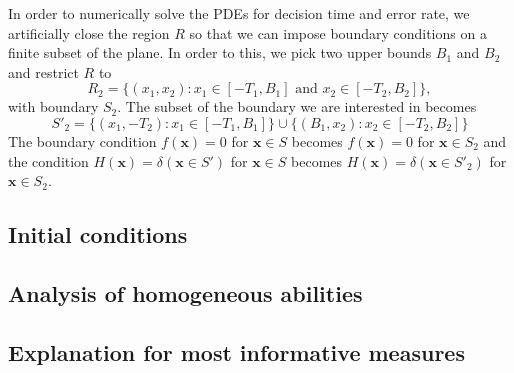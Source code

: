 \documentclass{article}
\newcommand{\mb}{\mathbf}
\begin{document}
In order to  numerically solve the PDEs for decision time and error rate, we artificially close the region $R$ so that we can impose boundary conditions on a finite subset of the plane. In order to this, we pick two upper bounds $B_1$ and $B_2$ and restrict $R$ to $$R_2=\{(x_1,x_2): x_1\in [-T_1,B_1] \text{ and } x_2\in[ -T_2,B_2]\},$$ with boundary $S_2$. The subset of the boundary we are interested in becomes 
$$S'_2=\{(x_1,-T_2):x_1\in [-T_1,B_1]\}\cup\{(B_1,x_2):x_2\in [-T_2,B_2]\}$$
The boundary condition $f({\mb x})=0$ for ${\mb x}\in S$ becomes $f({\mb x})=0$ for ${\mb x}\in S_2$ and the condition $H({\mb x})=\delta({\mb x}\in S')$ for ${\mb x}\in S$ becomes $H({\mb x})=\delta({\mb x}\in S'_2)$ for ${\mb x}\in S_2$.

\subsection{Initial conditions } 

\subsection{Analysis of homogeneous abilities }

\subsection{Explanation for most informative measures }
\end{document}
